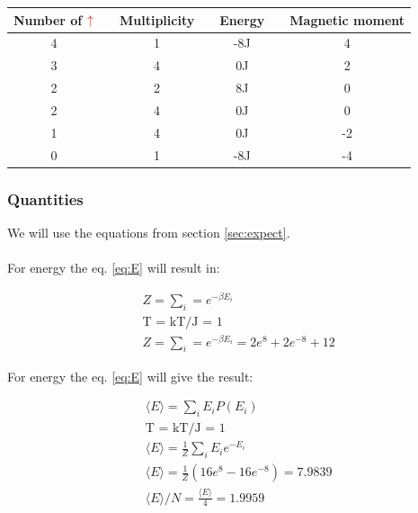 \begin{center}
\label{tab:states-2x2-summary}
\begin{tabularx}{\textwidth}{c X c X c X c}
    \hline 
    \hline 
        Number of $\color{red}{\uparrow}$ && Multiplicity && Energy && Magnetic moment \\ 
    \hline
        4   &&      1      &&      -8J     &&       4       \\  
        3   &&      4      &&      0J      &&       2       \\
        2   &&      2      &&      8J      &&       0       \\
        2   &&      4      &&      0J      &&       0       \\
        1   &&      4      &&      0J      &&       -2      \\
        0   &&      1      &&      -8J     &&       -4      \\
    \hline
\end{tabularx}
\end{center}












\pagebreak
\subsubsection{Quantities}

We will use the equations from section \ref{sec:expect}.
\\
\\
For energy the eq. \ref{eq:E} will result in:

\begin{align*}
    &Z = \sum_i = e^{-\beta E_i}
    \\
    &\text{T = kT/J = 1} 
    \\
    &Z = \sum_i = e^{-\beta E_i} = 2e^{8} + 2e^{-8} + 12
\end{align*}


For energy the eq. \ref{eq:E} will give the result:

\begin{align*}
    &\langle E \rangle = \sum_i E_iP(E_i)
    \\
    &\text{T = kT/J = 1} 
    \\
    &\langle E \rangle = \frac{1}{Z} \sum_i E_i e^{-E_i}
    \\
    &\langle E \rangle = \frac{1}{Z} \left( 16 e^8 - 16e^{-8} \right) = 7.9839
    \\ 
    &\langle E \rangle /N= \frac{\langle E \rangle}{4} = 1.9959
\end{align*}


